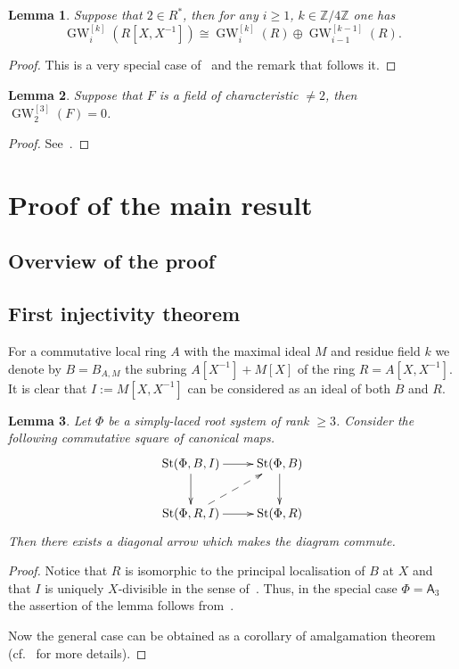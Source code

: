 \documentclass[oneside, 10pt]{amsart}
\newtheorem{lemma}{Lemma}
\theoremstyle{remark}
\theoremstyle{definition}
\DeclareMathOperator{\St}{St}
\DeclareMathOperator{\GW}{GW}
\newcommand{\ZZ}{\mathbb{Z}}
\newcommand{\rA}{\mathsf{A}}
\numberwithin{equation}{section}
\begin{document}
\begin{lemma}\label{bass-ft} Suppose that $2 \in R^*$, then for any $i\geq 1$, $k\in \ZZ/4\ZZ$ one has
 \[ \GW_i^{[k]}(R[X, X^{-1}]) \cong \GW_i^{[k]}(R) \oplus \GW_{i-1}^{[k-1]}(R). \] \end{lemma}
\begin{proof} This is a very special case of~\cite[Theorem~9.13]{Sch16} and the remark that follows it. \end{proof}

\begin{lemma}\label{lem:summary} Suppose that $F$ is a field of characteristic $\neq 2$, then
$\GW_2^{[3]}(F) = 0$. \end{lemma}
\begin{proof} See~\cite[Lemma~2.2]{FRS12}. \end{proof}

\section{Proof of the main result}
\subsection{Overview of the proof}
\subsection{First injectivity theorem}
For a commutative local ring $A$ with the maximal ideal $M$ and residue field $k$
we denote by $B = B_{A, M}$ the subring $A[X^{-1}] + M[X]$ of the ring $R = A[X, X^{-1}]$.
It is clear that $I := M[X, X^{-1}]$ can be considered as an ideal of both $B$ and $R$.
\begin{lemma}\label{lem:lemma32} Let $\Phi$ be a simply-laced root system of rank $\geq 3$.
Consider the following commutative square of canonical maps.
\[ \xymatrix{
    \St(\Phi, B, I) \ar[r] \ar[d] & \St(\Phi, B) \ar[d] \\
    \St(\Phi, R, I) \ar[r] \ar@{-->}[ur] & \St(\Phi, R)
   } \]
Then there exists a diagonal arrow which makes the diagram commute.   
\end{lemma} 
\begin{proof}
 Notice that $R$ is isomorphic to the principal localisation of $B$ at $X$
  and that $I$ is uniquely $X$-divisible in the sense of~\cite[\S~4]{LS17}.
 Thus, in the special case $\Phi = \rA_3$ the assertion of the lemma follows from~\cite[Theorem~3]{LS17}.
 
 Now the general case can be obtained as a corollary of amalgamation theorem~\cite[Theorem~9]{S15}
  (cf.~\cite[\S~4]{LS17} for more details).
\end{proof}
\end{document}

